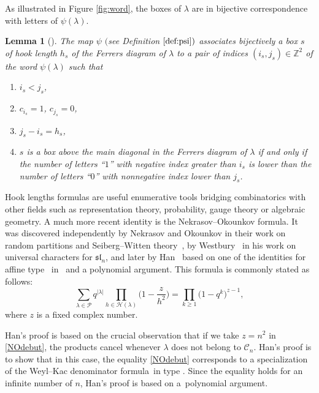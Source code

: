 \documentclass[pdftex]{sigma}
\newtheorem{Lemma}[Theorem]{Lemma}
\numberwithin{equation}{section}
\def\cch{\mathcal H}
\def\ccp{\mathcal P}
\newcommand{\Z}{\mathbb{Z}}
\begin{document}
As illustrated in Figure \ref{fig:word}, the boxes of $\lambda$ are in bijective correspondence with letters of $\psi(\lambda)$.
\begin{Lemma}[{\cite[Lemma $2.1$]{Wmac}}]\label{lem:indices}
The map $\psi$ $($see Definition $\ref{def:psi})$ associates bijectively a box $s$ of hook length $h_s$ of the Ferrers diagram of $\lambda$ to a pair of indices $(i_s,j_s)\in\Z^2$ of the word $\psi(\lambda)$ such that
\begin{enumerate}\itemsep=0pt
\item[$(1)$] $i_s<j_s$,
\item[$(2)$] $c_{i_s}=1$, $c_{j_s}=0$,
\item[$(3)$] $j_s-i_s=h_s$,
\item[$(4)$] $s$ is a box above the main diagonal in the Ferrers diagram of $\lambda$ if and only if the number of letters {\rm ``$1$''} with negative index greater than $i_s$ is lower than the number of letters {\rm ``$0$''} with nonnegative index lower than $j_s$.
\end{enumerate}
\end{Lemma}


Hook lengths formulas are useful enumerative tools bridging combinatorics with other fields such as representation theory, probability, gauge theory or algebraic geometry. A much more recent identity is the Nekrasov--Okounkov formula. It was discovered independently by Nekrasov and Okounkov in their work on random partitions and Seiberg--Witten theory~\cite{NO}, by Westbury~\cite{We} in his work on universal characters for $\mathfrak{sl}_n$, and later by Han~\cite{Ha} based on one of the identities for affine type ~in~\cite[Appendix $1$]{Mac} and a polynomial argument. This formula is commonly stated as follows:
\begin{equation*}
\sum_{\lambda\in\ccp}q^{\lvert \lambda\rvert}\prod_{h\in\cch(\lambda)}\biggl(1-\frac{z}{h^2}\biggr)=\prod_{k\geq 1}\bigl(1-q^k\bigr)^{z-1},
\end{equation*}
where $z$ is a fixed complex number.

Han's proof is based on the crucial observation that if we take $z=n^2$ in \eqref{NOdebut}, the products \smash{$\prod_{h\in\cch(\lambda)}\bigl(1-\frac{n^2}{h^2}\bigr)$} cancel whenever $\lambda$ does not belong to $\mathcal{C}_n$. Han's proof is to show that in this case, the equality \eqref{NOdebut} corresponds to a specialization of the Weyl--Kac denominator formula~in type . Since the equality holds for an infinite number of $n$, Han's proof is based on a~polynomial argument.
\end{document}
